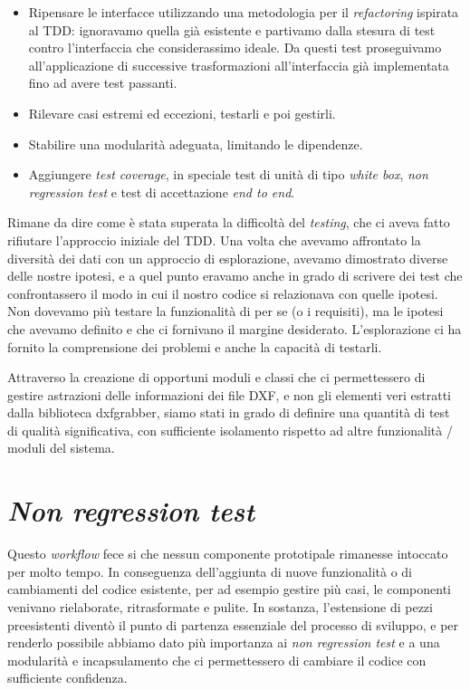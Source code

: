 \documentclass[12pt]{report}
\begin{document}
\begin{itemize}
	\item Ripensare le interfacce utilizzando una metodologia per il
\textit{refactoring} ispirata al TDD: ignoravamo quella già esistente
e partivamo dalla stesura di test contro l'interfaccia che considerassimo
ideale. Da questi test proseguivamo all'applicazione di successive
trasformazioni all'interfaccia già implementata fino ad avere test passanti. 
	\item Rilevare casi estremi ed eccezioni, testarli e poi gestirli.
	\item Stabilire una modularità adeguata, limitando le dipendenze.
	\item Aggiungere \textit{test coverage}, in speciale test di unità di
tipo \textit{white box}, \textit{non regression test} e test di
accettazione \textit{end to end}.
\end{itemize}

Rimane da dire come è stata superata la difficoltà del \textit{testing}, che
ci aveva fatto rifiutare l'approccio iniziale del TDD. Una volta che avevamo
affrontato la diversità dei dati con un approccio di esplorazione, avevamo
dimostrato diverse delle nostre ipotesi, e a quel punto eravamo anche in grado
di scrivere dei test che confrontassero il modo in cui il nostro codice si
relazionava con quelle ipotesi. Non dovevamo più testare la funzionalità di
per se (o i requisiti), ma le ipotesi che avevamo definito e che ci fornivano
il margine desiderato. L'esplorazione ci ha fornito la comprensione dei
problemi e anche la capacità di testarli.

Attraverso la creazione di opportuni moduli e classi che ci permettessero di
gestire astrazioni delle informazioni dei file DXF, e non gli elementi veri
estratti dalla biblioteca dxfgrabber, siamo stati in grado di definire una
quantità di test di qualità significativa, con sufficiente isolamento rispetto
ad altre funzionalità / moduli del sistema.

\section{\textit{Non regression test}}

Questo \textit{workflow} fece si che nessun componente prototipale
rimanesse intoccato per molto tempo. In conseguenza dell'aggiunta di
nuove funzionalità o di cambiamenti del codice esistente, per ad
esempio gestire più casi, le componenti venivano rielaborate,
ritrasformate e pulite. In sostanza, l'estensione di pezzi
preesistenti diventò il punto di partenza essenziale del
processo di sviluppo, e per renderlo possibile abbiamo dato più 
importanza ai \textit{non regression test} e a una 
modularità e incapsulamento che ci permettessero di
cambiare il codice con sufficiente confidenza. 
\end{document}
